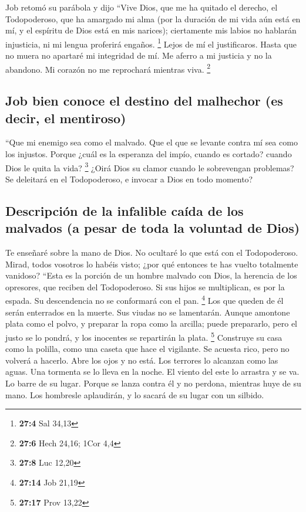  Job retomó su parábola y dijo  ``Vive Dios,
que me ha quitado el derecho, el Todopoderoso, que ha amargado mi alma
 (por la duración de mi vida aún está en mí, y el espíritu
de Dios está en mis narices);  ciertamente mis labios no
hablarán injusticia, ni mi lengua proferirá engaños. \footnote{\textbf{27:4}
  Sal 34,13}  Lejos de mí el justificaros. Hasta que no
muera no apartaré mi integridad de mí.  Me aferro a mi
justicia y no la abandono. Mi corazón no me reprochará mientras viva.
\footnote{\textbf{27:6} Hech 24,16; 1Cor 4,4}

\hypertarget{job-bien-conoce-el-destino-del-malhechor-es-decir-el-mentiroso}{%
\subsection{Job bien conoce el destino del malhechor (es decir, el
mentiroso)}\label{job-bien-conoce-el-destino-del-malhechor-es-decir-el-mentiroso}}

 ``Que mi enemigo sea como el malvado. Que el que se
levante contra mí sea como los injustos.  Porque ¿cuál es
la esperanza del impío, cuando es cortado? cuando Dios le quita la vida?
\footnote{\textbf{27:8} Luc 12,20}  ¿Oirá Dios su clamor
cuando le sobrevengan problemas?  Se deleitará en el
Todopoderoso, e invocar a Dios en todo momento?

\hypertarget{descripciuxf3n-de-la-infalible-cauxedda-de-los-malvados-a-pesar-de-toda-la-voluntad-de-dios}{%
\subsection{Descripción de la infalible caída de los malvados (a pesar
de toda la voluntad de
Dios)}\label{descripciuxf3n-de-la-infalible-cauxedda-de-los-malvados-a-pesar-de-toda-la-voluntad-de-dios}}

 Te enseñaré sobre la mano de Dios. No ocultaré lo que
está con el Todopoderoso.  Mirad, todos vosotros lo
habéis visto; ¿por qué entonces te has vuelto totalmente vanidoso?
 ``Esta es la porción de un hombre malvado con Dios, la
herencia de los opresores, que reciben del Todopoderoso. 
Si sus hijos se multiplican, es por la espada. Su descendencia no se
conformará con el pan. \footnote{\textbf{27:14} Job 21,19}
 Los que queden de él serán enterrados en la muerte. Sus
viudas no se lamentarán.  Aunque amontone plata como el
polvo, y preparar la ropa como la arcilla;  puede
prepararlo, pero el justo se lo pondrá, y los inocentes se repartirán la
plata. \footnote{\textbf{27:17} Prov 13,22}  Construye su
casa como la polilla, como una caseta que hace el vigilante.
 Se acuesta rico, pero no volverá a hacerlo. Abre los
ojos y no está.  Los terrores lo alcanzan como las aguas.
Una tormenta se lo lleva en la noche.  El viento del este
lo arrastra y se va. Lo barre de su lugar.  Porque se
lanza contra él y no perdona, mientras huye de su mano. 
Los hombresle aplaudirán, y lo sacará de su lugar con un silbido.

